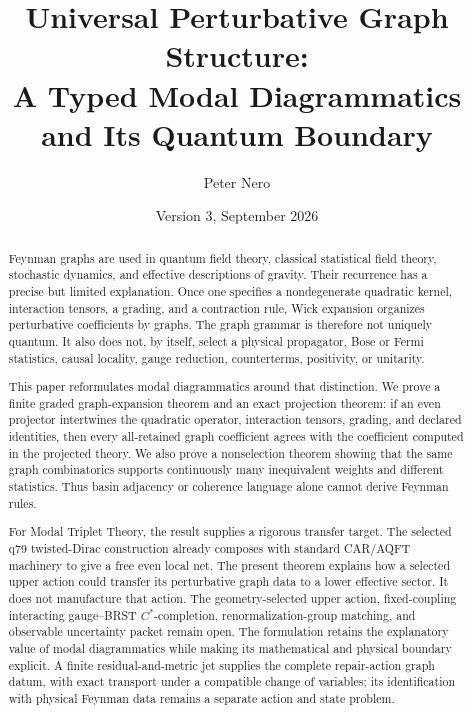 \documentclass[11pt,a4paper]{article}
\title{\textbf{Universal Perturbative Graph Structure:}\\
\large A Typed Modal Diagrammatics and Its Quantum Boundary}
\author{Peter Nero}
\date{Version 3, September 2026}
\begin{document}
\maketitle

\begin{abstract}
Feynman graphs are used in quantum field theory, classical statistical
field theory, stochastic dynamics, and effective descriptions of gravity.
Their recurrence has a precise but limited explanation.  Once one specifies
a nondegenerate quadratic kernel, interaction tensors, a grading, and a
contraction rule, Wick expansion organizes perturbative coefficients by
graphs.  The graph grammar is therefore not uniquely quantum.  It also does
not, by itself, select a physical propagator, Bose or Fermi statistics,
causal locality, gauge reduction, counterterms, positivity, or unitarity.

This paper reformulates modal diagrammatics around that distinction.  We
prove a finite graded graph-expansion theorem and an exact projection
theorem: if an even projector intertwines the quadratic operator,
interaction tensors, grading, and declared identities, then every
all-retained graph coefficient agrees with the coefficient computed in the
projected theory.  We also prove a nonselection theorem showing that the
same graph combinatorics supports continuously many inequivalent weights
and different statistics.  Thus basin adjacency or coherence language
alone cannot derive Feynman rules.

For Modal Triplet Theory, the result supplies a rigorous transfer target.
The selected q79 twisted-Dirac construction already composes with standard
CAR/AQFT machinery to give a free even local net.  The present theorem
explains how a selected upper action could transfer its perturbative graph
data to a lower effective sector.  It does not manufacture that action.
The geometry-selected upper action, fixed-coupling interacting
gauge--BRST \(C^*\)-completion, renormalization-group matching, and
observable uncertainty packet remain open.  The formulation
retains the explanatory value of modal diagrammatics while making its
mathematical and physical boundary explicit. A finite residual-and-metric
jet supplies the complete repair-action graph datum, with exact transport
under a compatible change of variables; its identification with physical
Feynman data remains a separate action and state problem.
\end{abstract}
\end{document}

